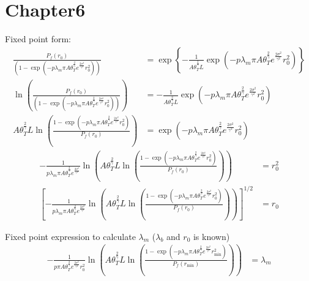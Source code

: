\chapter{Chapter6}
Fixed point form:
\begin{align}
\frac{ P_{f}(r_{0}) }{ ( 1- \exp(-p \lambda_{m} \pi A \theta_{T}^{\frac{2}{\gamma}} e^{\frac{2\sigma^2}{\gamma^2}}  r_{0}^2 ) )   }  &= \exp\left\lbrace -\frac{1}{ A \theta_{T}^{\frac{2}{\gamma}}  L }  \exp(-p \lambda_{m} \pi A \theta_{T}^{\frac{2}{\gamma}} e^{  \frac{2\sigma^2}{\gamma^2}  } r_{0}^2)  \right\rbrace \nonumber\\ 
\ln(\frac{ P_{f}(r_{0}) }{ ( 1- \exp(-p \lambda_{m} \pi A \theta_{T}^{\frac{2}{\gamma}} e^{\frac{2\sigma^2}{\gamma^2}}  r_{0}^2 ) )   } ) &= -\frac{1}{ A \theta_{T}^{\frac{2}{\gamma}}  L }  \exp(-p \lambda_{m} \pi A \theta_{T}^{\frac{2}{\gamma}} e^{  \frac{2\sigma^2}{\gamma^2}  } r_{0}^2) \nonumber\\ 
A \theta_{T}^{\frac{2}{\gamma}}  L \ln\left(   \frac{  1- \exp(-p \lambda_{m} \pi A \theta_{T}^{\frac{2}{\gamma}} e^{\frac{2\sigma^2}{\gamma^2}}  r_{0}^2 )  }{   P_{f}(r_{0})   }   \right)  &=  \exp(-p \lambda_{m} \pi A \theta_{T}^{\frac{2}{\gamma}} e^{  \frac{2\sigma^2}{\gamma^2}  } r_{0}^2)   \nonumber  
\end{align}
\begin{align}
-\frac{1}{ p \lambda_{m} \pi A \theta_{T}^{\frac{2}{\gamma}} e^{  \frac{2\sigma^2}{\gamma^2}  } }\ln\left(  A \theta_{T}^{\frac{2}{\gamma}}  L \ln\left(   \frac{  1- \exp(-p \lambda_{m} \pi A \theta_{T}^{\frac{2}{\gamma}} e^{\frac{2\sigma^2}{\gamma^2}}  r_{0}^2 )  }{   P_{f}(r_{0})   }   \right)  \right) &=   r_{0}^2    \nonumber\\
\left[  -\frac{1}{ p \lambda_{m} \pi A \theta_{T}^{\frac{2}{\gamma}} e^{  \frac{2\sigma^2}{\gamma^2}  } }\ln\left(  A \theta_{T}^{\frac{2}{\gamma}}  L \ln\left(   \frac{  1- \exp(-p \lambda_{m} \pi A \theta_{T}^{\frac{2}{\gamma}} e^{\frac{2\sigma^2}{\gamma^2}}  r_{0}^2 )  }{   P_{f}(r_{0})   }   \right)  \right)  \right] ^{1/2}&=   r_{0}    \nonumber
\end{align}

Fixed point expression to calculate $\lambda_m$ ($\lambda_b$ and $r_{0}$ is known)
\begin{align}
-\frac{1}{ p  \pi A \theta_{T}^{\frac{2}{\gamma} } e^{  \frac{2\sigma^2}{\gamma^2}  } r_{0}^2}\ln\left(  A \theta_{T}^{\frac{2}{\gamma}}  L \ln\left(   \frac{  1- \exp(-p \lambda_{m} \pi A \theta_{T}^{\frac{2}{\gamma}} e^{\frac{2\sigma^2}{\gamma^2}}  r_{\text{min}}^2 )  }{   P_{f}(r_{\text{min}})   }   \right)  \right) &=   \lambda_{m}   \nonumber
\end{align}

